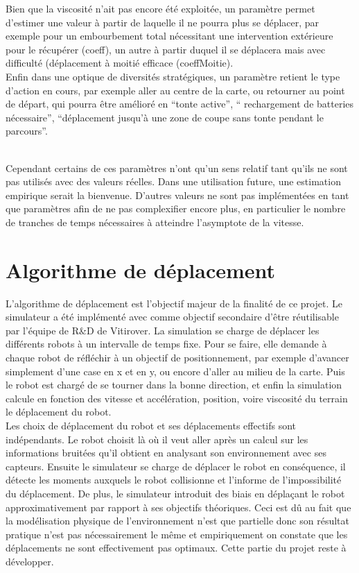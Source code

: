 \documentclass[usenames,dvipsnames]{report}
\begin{document}
     Bien que la viscosité n’ait pas encore été exploitée, un paramètre permet d’estimer une valeur à partir de laquelle il ne pourra plus se déplacer, 
     par exemple pour un embourbement total nécessitant une intervention extérieure pour le récupérer (coeff), un autre à partir duquel il se déplacera 
     mais avec difficulté (déplacement à moitié efficace (coeffMoitie). 
\\     
     
     Enfin dans une optique de diversités stratégiques, un paramètre retient le type
      d’action en cours, par exemple aller au centre de la carte, ou retourner au point de départ, qui pourra être amélioré en “tonte active”, “
      rechargement de batteries nécessaire”, “déplacement jusqu’à une zone de coupe sans tonte pendant le parcours”.
       
\\

    Cependant certains de ces paramètres n’ont qu’un sens relatif tant qu’ils ne sont pas utilisés avec des valeurs réelles.
     Dans une utilisation future, une estimation empirique serait la bienvenue. D’autres valeurs ne sont pas implémentées en
      tant que paramètres afin de ne pas complexifier encore plus, en particulier le nombre de tranches de temps nécessaires à atteindre l’asymptote de la vitesse.

    \chapter{Algorithme de déplacement}


    L’algorithme de déplacement est l’objectif majeur de la finalité de ce projet. 
    Le simulateur a été implémenté avec comme objectif secondaire d’être réutilisable par l’équipe de R&D de Vitirover.
    La simulation se charge de déplacer les différents robots à un intervalle de temps fixe.
     Pour se faire, elle demande à chaque robot de réfléchir à un objectif de positionnement,
      par exemple d’avancer simplement d’une case en x et en y, ou encore d’aller au milieu de la carte. Puis le robot est chargé de se tourner dans la bonne direction, et enfin la simulation calcule en fonction des vitesse et accélération, position, voire viscosité du terrain le déplacement du robot.
\\

    Les choix de déplacement du robot et ses déplacements effectifs sont indépendants. Le robot choisit là où il veut aller après un calcul sur les informations bruitées qu’il obtient en analysant son environnement avec ses capteurs. Ensuite le simulateur se charge de déplacer le robot en conséquence, il détecte les moments auxquels le robot collisionne et l’informe de l’impossibilité du déplacement. De plus, le simulateur introduit des biais en déplaçant le robot approximativement par rapport à ses objectifs théoriques. Ceci est dû au fait que la modélisation physique de l’environnement n’est que partielle donc son résultat pratique n’est pas nécessairement le même et empiriquement on constate que les déplacements ne sont effectivement pas optimaux. Cette partie du projet reste à développer.
\\
\end{document}
